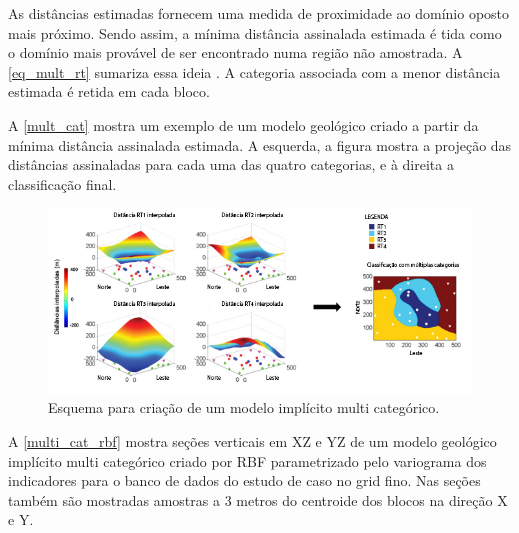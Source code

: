 As distâncias estimadas fornecem uma medida de proximidade ao domínio oposto mais próximo. Sendo assim, a mínima distância assinalada estimada é tida como o domínio mais provável de ser encontrado numa região não amostrada. A \autoref{eq_mult_rt} sumariza essa ideia \cite{silvaenhancedgeomodeling}. A categoria associada com a menor distância estimada é retida em cada bloco.

A \autoref{mult_cat} mostra um exemplo de um modelo geológico criado a partir da mínima distância assinalada estimada. A esquerda, a figura mostra a projeção das distâncias assinaladas para cada uma das quatro categorias, e à direita a classificação final.

\begin{figure}[H]
    \caption{\label{mult_cat}Esquema para criação de um modelo implícito multi categórico.}
	\begin{center}
		\includegraphics[width=\textwidth]{capitulo_2/mult_cat_legenda.jpg}
	\end{center}
\end{figure}

A \autoref{multi_cat_rbf} mostra seções verticais em XZ e YZ de um modelo geológico implícito multi categórico criado por RBF parametrizado pelo variograma dos indicadores para o banco de dados do estudo de caso no grid fino. Nas seções também são mostradas amostras a 3 metros do centroide dos blocos na direção X e Y.

